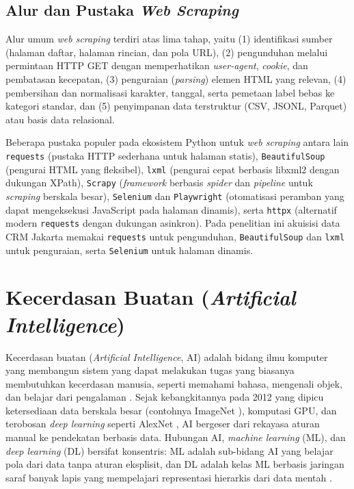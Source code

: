 \subsection{Alur dan Pustaka \textit{Web Scraping}}

Alur umum \textit{web scraping} terdiri atas lima tahap, yaitu (1) identifikasi sumber (halaman daftar, halaman rincian, dan pola URL), (2) pengunduhan melalui permintaan HTTP GET dengan memperhatikan \textit{user-agent}, \textit{cookie}, dan pembatasan kecepatan, (3) penguraian (\textit{parsing}) elemen HTML yang relevan, (4) pembersihan dan normalisasi karakter, tanggal, serta pemetaan label bebas ke kategori standar, dan (5) penyimpanan data terstruktur (CSV, JSONL, Parquet) atau basis data relasional.

Beberapa pustaka populer pada ekosistem Python untuk \textit{web scraping} antara lain \texttt{requests} (pustaka HTTP sederhana untuk halaman statis), \texttt{BeautifulSoup} (pengurai HTML yang fleksibel), \texttt{lxml} (pengurai cepat berbasis libxml2 dengan dukungan XPath), \texttt{Scrapy} (\textit{framework} berbasis \textit{spider} dan \textit{pipeline} untuk \textit{scraping} berskala besar), \texttt{Selenium} dan \texttt{Playwright} (otomatisasi peramban yang dapat mengeksekusi JavaScript pada halaman dinamis), serta \texttt{httpx} (alternatif modern \texttt{requests} dengan dukungan asinkron). Pada penelitian ini akuisisi data CRM Jakarta memakai \texttt{requests} untuk pengunduhan, \texttt{BeautifulSoup} dan \texttt{lxml} untuk penguraian, serta \texttt{Selenium} untuk halaman dinamis.

\section{Kecerdasan Buatan (\textit{Artificial Intelligence})}
\label{sec:ai}

Kecerdasan buatan (\textit{Artificial Intelligence}, AI) adalah bidang ilmu komputer yang membangun sistem yang dapat melakukan tugas yang biasanya membutuhkan kecerdasan manusia, seperti memahami bahasa, mengenali objek, dan belajar dari pengalaman \citep{russellArtificialIntelligence2021}. Sejak kebangkitannya pada 2012 yang dipicu ketersediaan data berskala besar (contohnya ImageNet \citep{russakovskyImageNet2015}), komputasi GPU, dan terobosan \textit{deep learning} seperti AlexNet \citep{krizhevskyImageNet2012}, AI bergeser dari rekayasa aturan manual ke pendekatan berbasis data. Hubungan AI, \textit{machine learning} (ML), dan \textit{deep learning} (DL) bersifat konsentris: ML adalah sub-bidang AI yang belajar pola dari data tanpa aturan eksplisit, dan DL adalah kelas ML berbasis jaringan saraf banyak lapis yang mempelajari representasi hierarkis dari data mentah \citep{lecunDeepLearning2015,goodfellowDeepLearning2016}.

